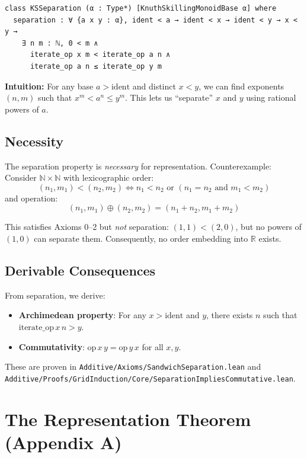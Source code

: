 \documentclass[11pt]{article}
\theoremstyle{definition}
\theoremstyle{remark}
\begin{document}
\begin{lstlisting}[caption={Separation axiom}]
class KSSeparation (α : Type*) [KnuthSkillingMonoidBase α] where
  separation : ∀ {a x y : α}, ident < a → ident < x → ident < y → x < y →
    ∃ n m : ℕ, 0 < m ∧
      iterate_op x m < iterate_op a n ∧
      iterate_op a n ≤ iterate_op y m
\end{lstlisting}

\textbf{Intuition:} For any base $a > \text{ident}$ and distinct $x < y$, we can find exponents $(n, m)$ such that $x^m < a^n \leq y^m$.
This lets us ``separate'' $x$ and $y$ using rational powers of $a$.

\subsection{Necessity}

The separation property is \emph{necessary} for representation.
Counterexample: Consider $\mathbb{N} \times \mathbb{N}$ with lexicographic order:
\[(n_1, m_1) < (n_2, m_2) \iff n_1 < n_2 \text{ or } (n_1 = n_2 \text{ and } m_1 < m_2)\]
and operation:
\[(n_1, m_1) \oplus (n_2, m_2) = (n_1 + n_2, m_1 + m_2)\]

This satisfies Axioms 0--2 but \emph{not} separation: $(1, 1) < (2, 0)$, but no powers of $(1, 0)$ can separate them.
Consequently, no order embedding into $\mathbb{R}$ exists.

\subsection{Derivable Consequences}

From separation, we derive:
\begin{itemize}
\item \textbf{Archimedean property}: For any $x > \text{ident}$ and $y$, there exists $n$ such that $\text{iterate\_op}\, x\, n > y$.
\item \textbf{Commutativity}: $\text{op}\, x\, y = \text{op}\, y\, x$ for all $x, y$.
\end{itemize}

These are proven in \texttt{Additive/Axioms/SandwichSeparation.lean} and \texttt{Additive/Proofs/GridInduction/Core/SeparationImpliesCommutative.lean}.

\section{The Representation Theorem (Appendix A)}
\label{sec:representation}
\end{document}

